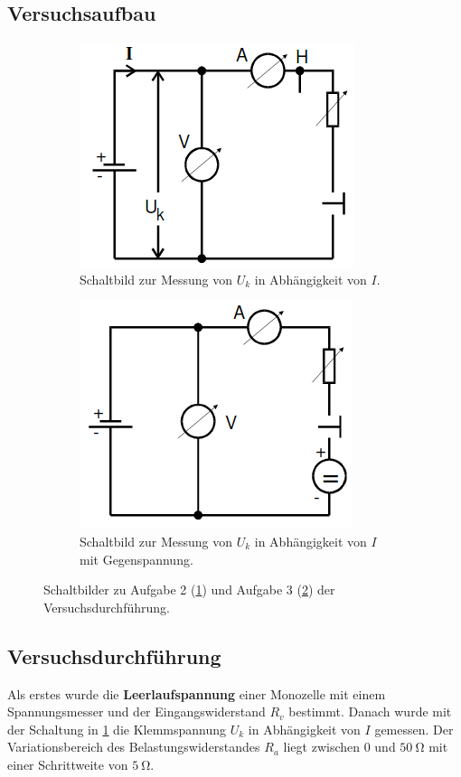 \subsection{Versuchsaufbau}
\begin{figure}
  \centering
  \begin{subfigure}{0.45\textwidth}
    \centering
    \includegraphics[scale=0.6]{durch.png}
    \caption{Schaltbild zur Messung von $U_k$ in Abhängigkeit von $I$.}
    \label{sub:1}
    \qquad
  \end{subfigure}
  \begin{subfigure}{0.45\textwidth}
    \centering
    \includegraphics[scale=0.6]{durch2.png}
    \caption{Schaltbild zur Messung von $U_k$ in Abhängigkeit von $I$ mit Gegenspannung.}
    \label{sub:2}
    \qquad
  \end{subfigure}
  \caption{Schaltbilder zu Aufgabe 2 (\ref{sub:1}) und Aufgabe 3 (\ref{sub:2})
  der Versuchsdurchführung.}
  \label{fig:2}
\end{figure}
\subsection{Versuchsdurchführung}
\label{sec:3.2}
Als erstes wurde die \textbf{Leerlaufspannung} einer Monozelle mit einem Spannungsmesser
und der Eingangswiderstand $R_v$ bestimmt. Danach wurde mit der Schaltung in \ref{sub:1}
die Klemmspannung $U_k$ in Abhängigkeit von $I$ gemessen. Der Variationsbereich des
Belastungswiderstandes $R_a$ liegt zwischen 0 und $\SI{50}{\ohm}$ mit einer
Schrittweite von $\SI{5}{\ohm}$.

